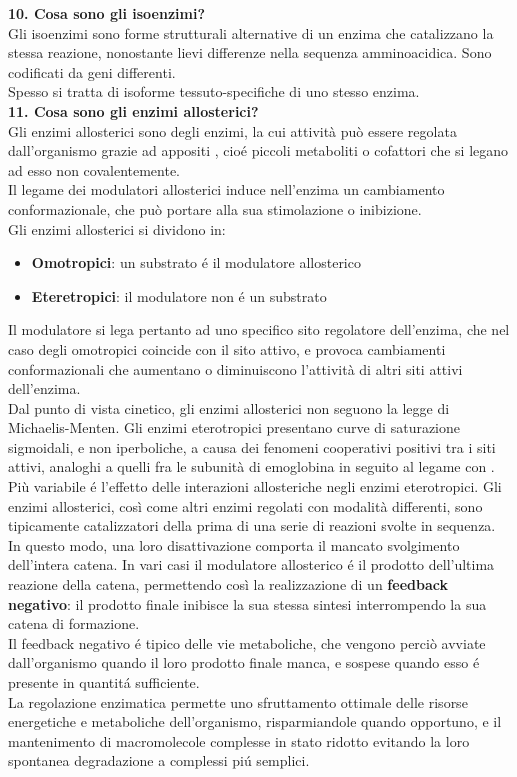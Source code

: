 \documentclass[a4paper,12pt]{article}
\begin{document}
\textbf{10. Cosa sono gli isoenzimi?}\\

Gli isoenzimi sono forme strutturali alternative di un enzima che catalizzano la stessa reazione, nonostante lievi differenze nella sequenza amminoacidica. Sono codificati da geni differenti.\\ Spesso si tratta di isoforme tessuto-specifiche di uno stesso enzima.\\

\textbf{11. Cosa sono gli enzimi allosterici?}\\

Gli enzimi allosterici sono degli enzimi, la cui attivit\`a pu\`o essere regolata dall'organismo grazie ad appositi , cio\'e piccoli metaboliti o cofattori che si legano ad esso non covalentemente.\\
Il legame dei modulatori allosterici induce nell'enzima un cambiamento conformazionale, che pu\`o portare alla sua stimolazione o inibizione.\\
Gli enzimi allosterici si dividono in:
\begin{itemize}
\item \textbf{Omotropici}: un substrato \'e il modulatore allosterico
\item \textbf{Eteretropici}: il modulatore non \'e un substrato
\end{itemize}
Il modulatore si lega pertanto ad uno specifico sito regolatore dell'enzima, che nel caso degli omotropici coincide con il sito attivo, e provoca cambiamenti conformazionali che aumentano o diminuiscono l'attivit\`a di altri siti attivi dell'enzima.\\
Dal punto di vista cinetico, gli enzimi allosterici non seguono la legge di Michaelis-Menten. Gli enzimi eterotropici presentano curve di saturazione sigmoidali, e non iperboliche, a causa dei fenomeni cooperativi positivi tra i siti attivi, analoghi a quelli fra le subunit\`a di emoglobina in seguito al legame con . Pi\`u variabile \'e l'effetto delle interazioni allosteriche negli enzimi eterotropici.
Gli enzimi allosterici, cos\`i come altri enzimi regolati con modalit\`a differenti, sono tipicamente catalizzatori della prima di una serie di reazioni svolte in sequenza. In questo modo, una loro disattivazione comporta il mancato svolgimento dell'intera catena. In vari casi il modulatore allosterico \'e il prodotto dell'ultima reazione della catena, permettendo cos\`i la realizzazione di un \textbf{feedback negativo}: il prodotto finale inibisce la sua stessa sintesi interrompendo la sua catena di formazione.\\
Il feedback negativo \'e tipico delle vie metaboliche, che vengono perci\`o  avviate dall'organismo quando il loro prodotto finale manca, e sospese quando esso \'e presente in quantit\'a sufficiente.\\
La regolazione enzimatica permette uno sfruttamento ottimale delle risorse energetiche e metaboliche dell'organismo, risparmiandole quando opportuno, e il mantenimento di macromolecole complesse in stato ridotto evitando la loro spontanea degradazione a complessi pi\'u semplici.
\end{document}
